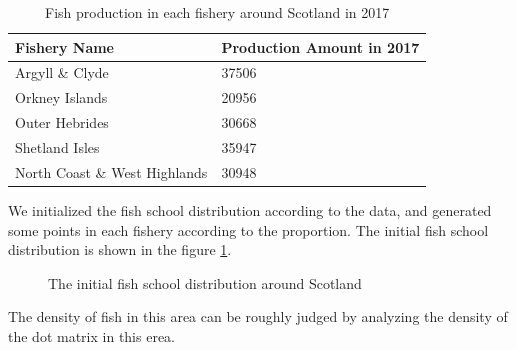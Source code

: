 \documentclass{mcmthesis}
\numberwithin{figure}{section}
\numberwithin{table}{section}
\begin{document}
\begin{table}[H]
  \centering
  \begin{tabular}{|l|l|}%
  \hline  %
  \textbf{Fishery Name}&\textbf{Production Amount in 2017}\\
  \hline  %
  Argyll \& Clyde & 37506\\
  \hline %
  Orkney Islands & 20956\\
  \hline %
  Outer Hebrides  & 30668\\
  \hline %
  Shetland Isles & 35947\\
  \hline %
  North Coast \& West Highlands & 30948\\
  \hline %
  \end{tabular}
  \caption{Fish production in each fishery around Scotland in 2017}
  \label{FisheryAmount}
  \end{table}

We initialized the fish school distribution according to the data, and generated some points in each fishery according to the proportion. The initial fish school distribution is shown in the figure \ref{InitDist}.

\begin{figure}[H]
  \caption{The initial fish school distribution around Scotland}\label{InitDist}
\end{figure}

The density of fish in this area can be roughly judged by analyzing the density of the dot matrix in this erea.
\end{document}
